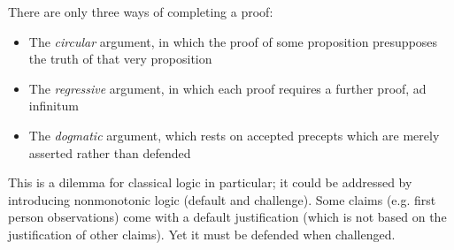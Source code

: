 There are only three ways of completing a proof:
\begin{itemize}
    \item The \emph{circular} argument, in which the proof of some proposition presupposes the truth of that very proposition
    \item The \emph{regressive} argument, in which each proof requires a further proof, ad infinitum
    \item The \emph{dogmatic} argument, which rests on accepted precepts which are merely asserted rather than defended
\end{itemize}

This is a dilemma for classical logic in particular; it could be addressed by introducing nonmonotonic logic (default and challenge). Some claims (e.g. first person observations) come with a default justification (which is not based on the justification of other claims). Yet it must be defended when challenged.